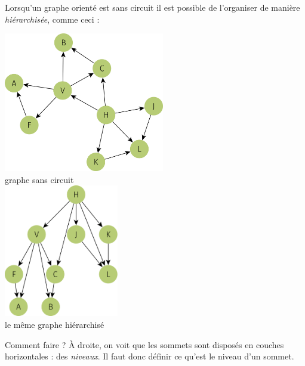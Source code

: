 Lorsqu'un graphe orienté est sans circuit il est possible de l'organiser de manière \textit{hiérarchisée}, comme ceci :
\begin{multicols}{2}
    \begin{center}
        \includegraphics[width=7cm]{graphes2/img/graphe_sans_circuit_non_hierarchise.png}\\ \footnotesize graphe sans circuit\\
        \includegraphics[width=5cm]{graphes2/img/graphe_sans_circuit_hierarchise.png}\\ \footnotesize le même graphe  hiérarchisé
    \end{center}
\end{multicols}

Comment faire ? À droite, on voit que les sommets sont disposés en couches horizontales : des \textit{niveaux}. Il faut donc définir ce qu'est le niveau d'un sommet.

